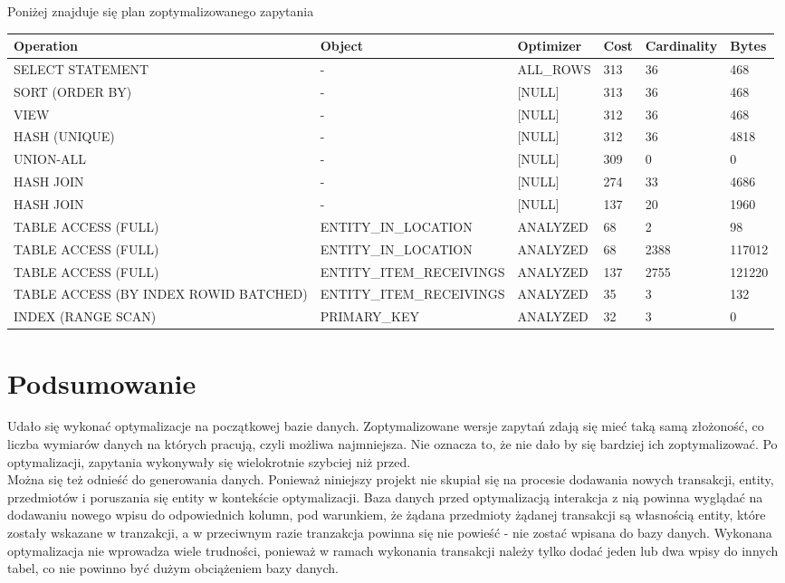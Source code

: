 \documentclass[11pt]{article}
\numberwithin{figure}{subsection}
\begin{document}
		Poniżej znajduje się plan zoptymalizowanego zapytania \\
		
		\begin{tabularx}{\textwidth}{|X|X|X|X|X|X|}
Operation&Object&Optimizer&Cost&Cardinality&Bytes\\ \hline
SELECT STATEMENT& - &ALL\_ROWS&313&36&468\\ \hline
SORT (ORDER BY)& - &[NULL]&313&36&468\\ \hline
VIEW& - &[NULL]&312&36&468\\ \hline
HASH (UNIQUE)& - &[NULL]&312&36&4818\\ \hline
UNION-ALL& - &[NULL]&309&0&0\\ \hline
HASH JOIN& - &[NULL]&274&33&4686\\ \hline
HASH JOIN& - &[NULL]&137&20&1960\\ \hline
TABLE ACCESS (FULL)&ENTITY\_IN\_LOCATION&ANALYZED&68&2&98\\ \hline
TABLE ACCESS (FULL)&ENTITY\_IN\_LOCATION&ANALYZED&68&2388&117012\\ \hline
TABLE ACCESS (FULL)&ENTITY\_ITEM\_RECEIVINGS&ANALYZED&137&2755&121220\\ \hline
TABLE ACCESS (BY INDEX ROWID BATCHED)&ENTITY\_ITEM\_RECEIVINGS&ANALYZED&35&3&132\\ \hline
INDEX (RANGE SCAN)&PRIMARY\_KEY&ANALYZED&32&3&0\\ \hline
		\end{tabularx}
		

\section{Podsumowanie}
	Udało się wykonać optymalizacje na początkowej bazie danych. Zoptymalizowane
	wersje zapytań zdają się mieć taką samą złożoność, co liczba wymiarów danych
	na których pracują, czyli możliwa najmniejsza. Nie oznacza to, że nie dało
	by się bardziej ich zoptymalizować.
	Po optymalizacji, zapytania wykonywały się wielokrotnie szybciej niż przed.
	\\
	Można się też odnieść do generowania danych. Ponieważ niniejszy projekt nie
	skupiał się na procesie dodawania nowych transakcji, entity, przedmiotów i
	poruszania się entity w kontekście optymalizacji. Baza danych przed
	optymalizacją interakcja z nią powinna wyglądać na dodawaniu nowego wpisu do
	odpowiednich kolumn, pod warunkiem, że żądana przedmioty żądanej transakcji
	są własnością entity, które zostały wskazane w tranzakcji, a w przeciwnym
	razie tranzakcja powinna się nie powieść - nie zostać wpisana do bazy
	danych. Wykonana optymalizacja nie wprowadza wiele trudności, ponieważ w
	ramach wykonania transakcji należy tylko dodać jeden lub dwa wpisy do innych
	tabel, co nie powinno być dużym obciążeniem bazy danych.
	
\end{document}

